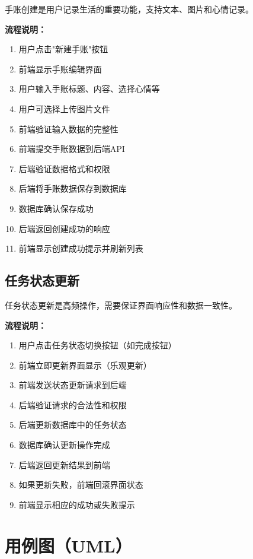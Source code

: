 \documentclass[a4paper]{article}
\begin{document}
手账创建是用户记录生活的重要功能，支持文本、图片和心情记录。

\textbf{流程说明：}

\begin{enumerate}
    \item 用户点击"新建手账"按钮
    \item 前端显示手账编辑界面
    \item 用户输入手账标题、内容、选择心情等
    \item 用户可选择上传图片文件
    \item 前端验证输入数据的完整性
    \item 前端提交手账数据到后端API
    \item 后端验证数据格式和权限
    \item 后端将手账数据保存到数据库
    \item 数据库确认保存成功
    \item 后端返回创建成功的响应
    \item 前端显示创建成功提示并刷新列表
\end{enumerate}

\subsection{任务状态更新}

任务状态更新是高频操作，需要保证界面响应性和数据一致性。

\textbf{流程说明：}

\begin{enumerate}
    \item 用户点击任务状态切换按钮（如完成按钮）
    \item 前端立即更新界面显示（乐观更新）
    \item 前端发送状态更新请求到后端
    \item 后端验证请求的合法性和权限
    \item 后端更新数据库中的任务状态
    \item 数据库确认更新操作完成
    \item 后端返回更新结果到前端
    \item 如果更新失败，前端回滚界面状态
    \item 前端显示相应的成功或失败提示
\end{enumerate}

\section{用例图（UML）}
\end{document}
